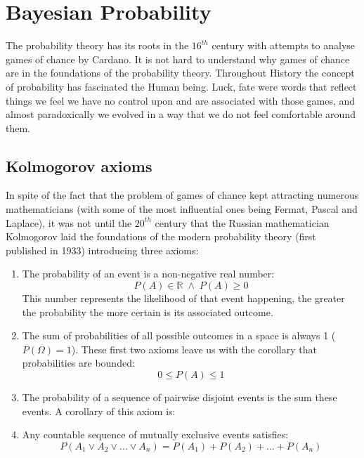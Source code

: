 \section{Bayesian Probability}
\label{sec:int_bayesian_probability}

\label{subsec:int_int_bayesian_probability}

The probability theory has its roots in the $16^{th}$ century with attempts to analyse games of chance by Cardano. It is not hard to understand why games of chance are in the foundations of the probability theory. Throughout History the concept of probability has fascinated the Human being. Luck, fate were words that reflect things we feel we have no control upon and are associated with those games, and almost paradoxically we evolved in a way that we do not feel comfortable around them. 

\subsection{Kolmogorov axioms}

In spite of the fact that the problem of games of chance kept attracting numerous mathematicians (with some of the most influential ones being Fermat, Pascal and Laplace), it was not until the $20^{th}$ century that the Russian mathematician Kolmogorov laid the foundations of the modern probability theory (first published in 1933) introducing three axioms\cite{sep-probability-interpret}:

\begin{enumerate}
\item The probability of an event is a non-negative real number:
\begin{equation}
 P(A)\in\mathbb{R\;}\wedge\; P(A)\geq0
\end{equation}
This number represents the likelihood of that event happening, the greater the probability the more certain is its associated outcome. 
\item The sum of probabilities of all possible outcomes in a space is always 1 ($P(\Omega)=1$). These first two axioms leave us with the corollary that probabilities are bounded:
 \begin{equation}
0\leq P(A)\leq1
\end{equation}
\item The probability of a sequence of pairwise disjoint events is the sum these events. A corollary of this axiom is:
\item Any countable sequence of mutually exclusive events satisfies:
\begin{equation}
P(A_{1}\vee A_{2} \vee ... \vee A_{n})=P(A_{1})+P(A_{2}) + ... + P(A_{n})
\end{equation}

\end{enumerate}

